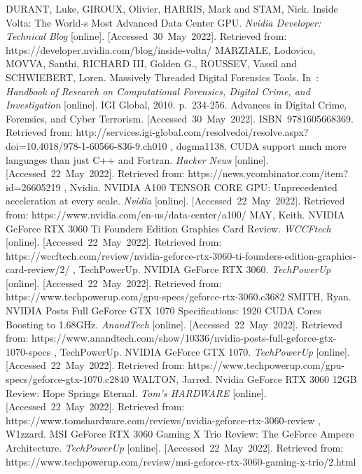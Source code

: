 \begin{thebibliography}{42}
	DURANT, Luke, GIROUX, Olivier, HARRIS, Mark and STAM, Nick. Inside Volta: The World-s Most Advanced Data Center GPU. \textit{Nvidia Developer: Technical Blog} [online]. [Accessed 30 May 2022]. Retrieved from: https://developer.nvidia.com/blog/inside-volta/
	MARZIALE, Lodovico, MOVVA, Santhi, RICHARD III, Golden G., ROUSSEV, Vassil and SCHWIEBERT, Loren. Massively Threaded Digital Forensics Tools. In : \textit{Handbook of Research on Computational Forensics, Digital Crime, and Investigation} [online]. IGI Global, 2010. p. 234-256. Advances in Digital Crime, Forensics, and Cyber Terrorism. [Accessed 30 May 2022]. ISBN 9781605668369. Retrieved from: http://services.igi-global.com/resolvedoi/resolve.aspx?doi=10.4018/978-1-60566-836-9.ch010
	, dogma1138. CUDA support much more languages than just C++ and Fortran. \textit{Hacker News} [online]. [Accessed 22 May 2022]. Retrieved from: https://news.ycombinator.com/item?id=26605219
	, Nvidia. NVIDIA A100 TENSOR CORE GPU: Unprecedented acceleration at every scale. \textit{Nvidia} [online]. [Accessed 22 May 2022]. Retrieved from: https://www.nvidia.com/en-us/data-center/a100/
	MAY, Keith. NVIDIA GeForce RTX 3060 Ti Founders Edition Graphics Card Review. \textit{WCCFtech} [online]. [Accessed 22 May 2022]. Retrieved from: https://wccftech.com/review/nvidia-geforce-rtx-3060-ti-founders-edition-graphics-card-review/2/
	, TechPowerUp. NVIDIA GeForce RTX 3060. \textit{TechPowerUp} [online]. [Accessed 22 May 2022]. Retrieved from: https://www.techpowerup.com/gpu-specs/geforce-rtx-3060.c3682
	SMITH, Ryan. NVIDIA Posts Full GeForce GTX 1070 Specifications: 1920 CUDA Cores Boosting to 1.68GHz. \textit{AnandTech} [online]. [Accessed 22 May 2022]. Retrieved from: https://www.anandtech.com/show/10336/nvidia-posts-full-geforce-gtx-1070-specs
	, TechPowerUp. NVIDIA GeForce GTX 1070. \textit{TechPowerUp} [online]. [Accessed 22 May 2022]. Retrieved from: https://www.techpowerup.com/gpu-specs/geforce-gtx-1070.c2840
	WALTON, Jarred. Nvidia GeForce RTX 3060 12GB Review: Hope Springs Eternal. \textit{Tom's HARDWARE} [online]. [Accessed 22 May 2022]. Retrieved from: https://www.tomshardware.com/reviews/nvidia-geforce-rtx-3060-review
	, W1zzard. MSI GeForce RTX 3060 Gaming X Trio Review: The GeForce Ampere Architecture. \textit{TechPowerUp} [online]. [Accessed 22 May 2022]. Retrieved from: https://www.techpowerup.com/review/msi-geforce-rtx-3060-gaming-x-trio/2.html

\end{thebibliography}
